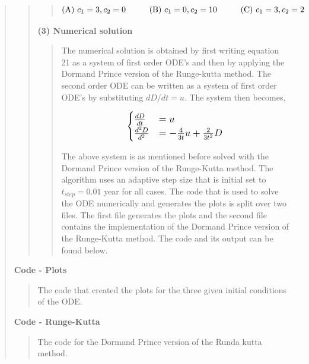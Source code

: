 \begin{quote}
\begin{quote}
\begin{quote}
\begin{equation}
\text{(A) } c_1 = 3, c_2 = 0 \hspace*{1cm} \text{(B) } c_1 =0, c_2 = 10 \hspace*{1cm} \text{(C) } c_1 = 3, c_2 = 2 
\end{equation}

\end{quote}


\textbf{(3) Numerical solution}
\begin{quote}
The numerical solution is obtained by first writing equation 21 as a system of first order ODE's and then by applying the Dormand\- Prince version of the Runge-kutta method. The second order ODE  can be written as a system of first order ODE's by substituting $dD/dt = u$. The system then becomes,

\begin{equation}
\large
\begin{cases} 
\frac{dD}{dt} &= u \\ 
\frac{d^2D}{d^2} &= - \frac{4}{3t}u + \frac{2}{3t^2}D 
\end{cases}
\end{equation}

The above system is as mentioned before solved with the Dormand\- Prince version of the Runge-Kutta method. The algorithm uses an adaptive step size that is initial set to $t_{step} = 0.01$ year for all cases. The code that is used to solve the ODE numerically and generates the plots is split over two files. The first file generates the plots and the second file contains the implementation of the Dormand\- Prince version of the Runge-Kutta method. The code and its output can be found below. %
\end{quote}


\newpage
 
\end{quote}

\textbf{Code - Plots}

\begin{quote}
The code that created the plots for the three given initial conditions of the ODE. %
\centering

\end{quote}

\textbf{Code - Runge-Kutta}
\begin{quote}

The code for the Dormand\- Prince version of the Runda kutta method. 


\end{quote}
\end{quote}
